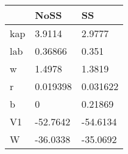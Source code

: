 \begin{tabular}{lll}
& NoSS & SS \\ 
\hline 
kap & 3.9114 & 2.9777 \\ 
lab & 0.36866 & 0.351 \\ 
w & 1.4978 & 1.3819 \\ 
r & 0.019398 & 0.031622 \\ 
b & 0 & 0.21869 \\ 
V1 & -52.7642 & -54.6134 \\ 
W & -36.0338 & -35.0692 \\ 
\hline 
\end{tabular}